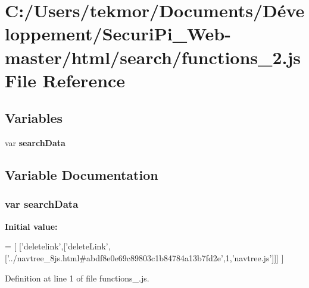 \section{C\+:/\+Users/tekmor/\+Documents/\+Développement/\+Securi\+Pi\+\_\+\+Web-\/master/html/search/functions\+\_\+2.js File Reference}
\label{functions__2_8js}
\subsection*{Variables}
\begin{DoxyCompactItemize}
\item 
var {\bf search\+Data}
\end{DoxyCompactItemize}


\subsection{Variable Documentation}
\subsubsection[{search\+Data}]{\setlength{\rightskip}{0pt plus 5cm}var search\+Data}\label{functions__2_8js_ad01a7523f103d6242ef9b0451861231e}
{\bfseries Initial value\+:}
\begin{DoxyCode}
=
[
  [\textcolor{stringliteral}{'deletelink'},[\textcolor{stringliteral}{'deleteLink'},[\textcolor{stringliteral}{'../navtree\_8js.html#abdf8e0e69c89803c1b84784a13b7fd2e'},1,\textcolor{stringliteral}{'navtree.js'}]]]
]
\end{DoxyCode}


Definition at line 1 of file functions\+\_.\+js.

